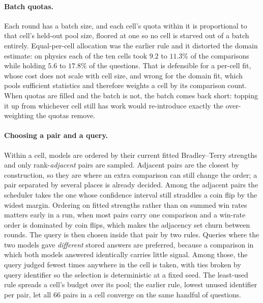 \paragraph{Batch quotas.}
Each round has a batch size, and each cell's quota within it is
proportional to that cell's held-out pool size, floored at one so no
cell is starved out of a batch entirely. Equal-per-cell allocation was
the earlier rule and it distorted the domain estimate: on physics each
of the ten cells took $9.2$ to $11.3\%$ of the comparisons while
holding $5.6$ to $17.8\%$ of the questions. That is defensible for a
per-cell fit, whose cost does not scale with cell size, and wrong for
the domain fit, which pools sufficient statistics and therefore weights
a cell by its comparison count. When quotas are filled and the batch is
not, the batch comes back short: topping it up from whichever cell
still has work would re-introduce exactly the over-weighting the
quotas remove.

\paragraph{Choosing a pair and a query.}
Within a cell, models are ordered by their current fitted
Bradley--Terry strengths and only rank-\emph{adjacent} pairs are
sampled. Adjacent pairs are the closest by construction, so they are
where an extra comparison can still change the order; a pair separated
by several places is already decided. Among the adjacent pairs the
scheduler takes the one whose confidence interval still straddles a
coin flip by the widest margin. Ordering on fitted strengths rather
than on summed win rates matters early in a run, when most pairs carry
one comparison and a win-rate order is dominated by coin flips, which
makes the adjacency set churn between rounds.
The query is then chosen inside that pair by two rules. Queries where
the two models gave \emph{different} stored answers are preferred,
because a comparison in which both models answered identically carries
little signal. Among those, the query judged fewest times anywhere in
the cell is taken, with ties broken by query identifier so the
selection is deterministic at a fixed seed. The least-used rule spreads
a cell's budget over its pool; the earlier rule, lowest unused
identifier per pair, let all 66 pairs in a cell converge on the same
handful of questions.

